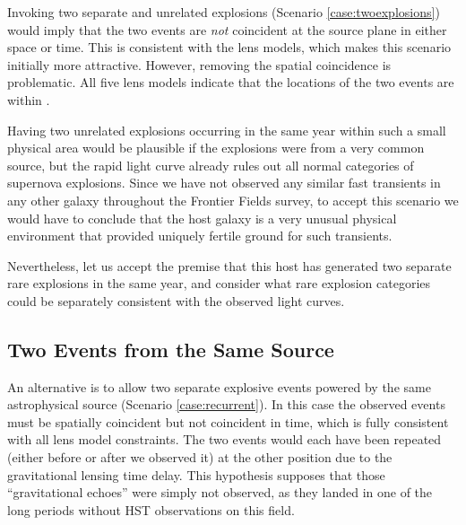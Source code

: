 Invoking two separate and unrelated explosions (Scenario
\ref{case:twoexplosions}) would imply that the two events are {\it
  not} coincident at the source plane in either space or time.  This
is consistent with the lens models, which makes this scenario
initially more attractive.  However, removing the spatial coincidence
is problematic.  All five lens models indicate that the locations of
the two events are within .


Having two unrelated explosions occurring in the same
year within such a small physical area would be plausible if the
explosions were from a very common source, but the rapid light curve
already rules out all normal categories of supernova explosions.
Since we have not observed any similar fast transients in any other
galaxy throughout the Frontier Fields survey, to accept this scenario
we would have to conclude that the \spock host galaxy is a very
unusual physical environment that provided uniquely fertile ground for
such transients.


Nevertheless, let us accept the premise that this host has generated
two separate rare explosions in the same year, and consider what rare
explosion categories could be separately consistent with the observed
light curves.


\subsection{Two Events from the Same Source}

An alternative is to allow two separate explosive events powered by
the same astrophysical source (Scenario \ref{case:recurrent}).  In
this case the observed events must be spatially coincident but not
coincident in time, which is fully consistent with all lens model
constraints. The two \spock events would each have been repeated
(either before or after we observed it) at the other position due to
the gravitational lensing time delay.  This hypothesis supposes that
those ``gravitational echoes'' were simply not observed, as they
landed in one of the long periods without HST observations on this
field.

